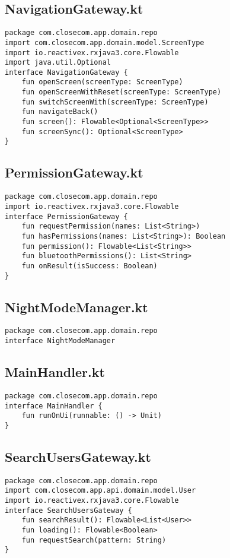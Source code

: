 \documentclass[listing]{espd}
\begin{document}
\subsection{NavigationGateway.kt}
\begin{verbatim}
package com.closecom.app.domain.repo
import com.closecom.app.domain.model.ScreenType
import io.reactivex.rxjava3.core.Flowable
import java.util.Optional
interface NavigationGateway {
    fun openScreen(screenType: ScreenType)
    fun openScreenWithReset(screenType: ScreenType)
    fun switchScreenWith(screenType: ScreenType)
    fun navigateBack()
    fun screen(): Flowable<Optional<ScreenType>>
    fun screenSync(): Optional<ScreenType>
}
\end{verbatim}

\subsection{PermissionGateway.kt}
\begin{verbatim}
package com.closecom.app.domain.repo
import io.reactivex.rxjava3.core.Flowable
interface PermissionGateway {
    fun requestPermission(names: List<String>)
    fun hasPermissions(names: List<String>): Boolean
    fun permission(): Flowable<List<String>>
    fun bluetoothPermissions(): List<String>
    fun onResult(isSuccess: Boolean)
}
\end{verbatim}

\subsection{NightModeManager.kt}
\begin{verbatim}
package com.closecom.app.domain.repo
interface NightModeManager
\end{verbatim}

\subsection{MainHandler.kt}
\begin{verbatim}
package com.closecom.app.domain.repo
interface MainHandler {
    fun runOnUi(runnable: () -> Unit)
}
\end{verbatim}

\subsection{SearchUsersGateway.kt}
\begin{verbatim}
package com.closecom.app.domain.repo
import com.closecom.app.api.domain.model.User
import io.reactivex.rxjava3.core.Flowable
interface SearchUsersGateway {
    fun searchResult(): Flowable<List<User>>
    fun loading(): Flowable<Boolean>
    fun requestSearch(pattern: String)
}
\end{verbatim}
\end{document}
